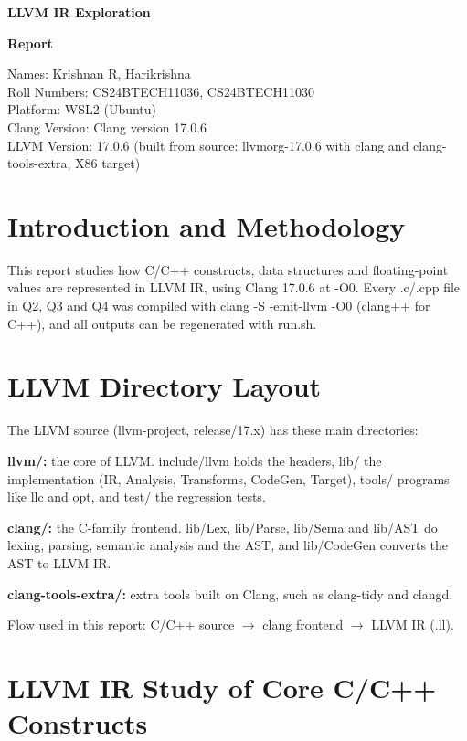 \documentclass[11pt,a4paper]{article}
\begin{document}
\begin{center}
{\Large\bfseries LLVM IR Exploration\par}
\vspace{4pt}
{\large\bfseries Report\par}
\end{center}

\noindent Names: Krishnan R, Harikrishna\\
Roll Numbers: CS24BTECH11036, CS24BTECH11030\\
Platform: WSL2 (Ubuntu)\\
Clang Version: Clang version 17.0.6\\
LLVM Version: 17.0.6 (built from source: llvmorg-17.0.6 with clang and clang-tools-extra, X86 target)

\tableofcontents

\clearpage
\section*{Introduction and Methodology}

This report studies how C/C++ constructs, data structures and floating-point values are represented in LLVM IR, using Clang 17.0.6 at -O0. Every .c/.cpp file in Q2, Q3 and Q4 was compiled with clang -S -emit-llvm -O0 (clang++ for C++), and all outputs can be regenerated with run.sh.

\section{LLVM Directory Layout}

The LLVM source (llvm-project, release/17.x) has these main directories:

\textbf{llvm/: }the core of LLVM. include/llvm holds the headers, lib/ the implementation (IR, Analysis, Transforms, CodeGen, Target), tools/ programs like llc and opt, and test/ the regression tests.

\textbf{clang/: }the C-family frontend. lib/Lex, lib/Parse, lib/Sema and lib/AST do lexing, parsing, semantic analysis and the AST, and lib/CodeGen converts the AST to LLVM IR.

\textbf{clang-tools-extra/: }extra tools built on Clang, such as clang-tidy and clangd.

Flow used in this report: C/C++ source $\rightarrow$ clang frontend $\rightarrow$ LLVM IR (.ll).

\section{LLVM IR Study of Core C/C++ Constructs}
\end{document}
